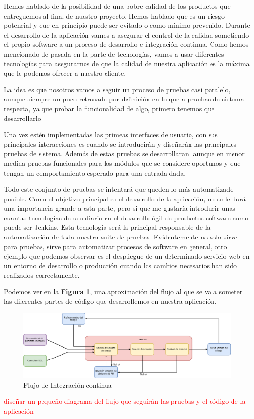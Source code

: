 Hemos hablado de la posibilidad de una pobre calidad de los productos que entreguemos al final de nuestro proyecto. Hemos hablado que es un riesgo potencial y que en principio puede ser evitado o como mínimo prevenido. Durante el desarrollo de la aplicación vamos a asegurar el control de la calidad sometiendo el propio software a un proceso de desarrollo e integración continua. Como hemos mencionado de pasada en la parte de tecnologías, vamos a usar diferentes tecnologías para asegurarnos de que la calidad de nuestra aplicación es la máxima que le podemos ofrecer a nuestro cliente. 

La idea es que nosotros vamos a seguir un proceso de pruebas casi paralelo, aunque siempre un poco retrasado por definición en lo que a pruebas de sistema respecta, ya que probar la funcionalidad de algo, primero tenemos que desarrollarlo. 

Una vez estén implementadas las primeas interfaces de usuario, con sus principales interacciones es cuando se introducirán y diseñarán las principales pruebas de sistema. Además de estas pruebas se desarrollaran, aunque en menor medida pruebas funcionales para los módulos que se considere oportunos y que tengan un comportamiento esperado para una entrada dada. 

Todo este conjunto de pruebas se intentará que queden lo más automatizado posible. Como el objetivo principal es el desarrollo de la aplicación, no se le dará una importancia grande a esta parte, pero si que me gustaría introducir unas cuantas tecnologías de uso diario en el desarrollo ágil de productos software como puede ser Jenkins. Esta tecnología será la principal responsable de la automatización de toda nuestra suite de pruebas. Evidentemente no solo sirve para pruebas, sirve para automatizar procesos de software en general, otro ejemplo que podemos observar es el despliegue de un determinado servicio web en un entorno de desarrollo o producción cuando los cambios necesarios han sido realizados correctamente. 

Podemos ver en la \textbf{Figura \ref{fig:cicd}}, una aproximación del flujo al que se va a someter las diferentes partes de código que desarrollemos en nuestra aplicación.

\vspace{2cm}

\begin{figure}[H]
    \centering
    \includegraphics[scale=0.45]{imagenes/planificacionGestion/cicd.png}
    \caption{Flujo de Integración continua}
    \label{fig:cicd}
\end{figure}

\textcolor{red}{diseñar un pequeño diagrama del flujo que seguirán las pruebas y el código de la aplicación}